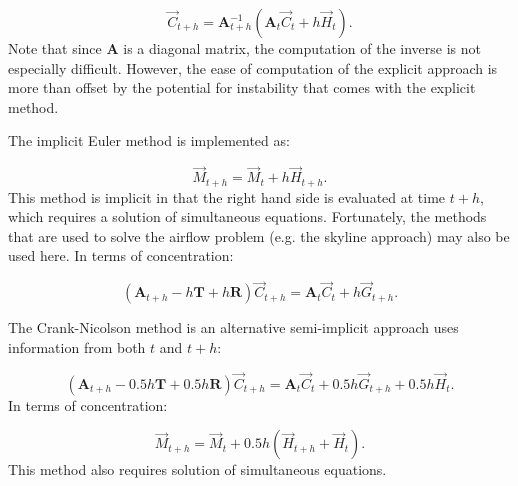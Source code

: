 \documentclass[10pt]{report}
\newcommand{\mat}[1]{\ensuremath{\mathbf{#1}}}
\begin{document}
\begin{equation}
\vec{C}_{t+h} = \mat{A}_{t+h}^{-1}\left( \mat{A}_{t}\vec{C}_t + h\vec{H}_t\right).
\end{equation}
\noindent
Note that since $\mat{A}$ is a diagonal matrix, the computation of the inverse is not
especially difficult. However, the ease of computation of the explicit approach is more
than offset by the potential for instability that comes with the explicit method.

The implicit Euler method is implemented as:

\begin{equation}
\vec{M}_{t+h} = \vec{M}_t + h\vec{H}_{t+h}.
\end{equation}
\noindent
This method is implicit in that the right hand side is evaluated at time $t+h$, which
requires a solution of simultaneous equations. Fortunately, the methods that are used
to solve the airflow problem (e.g. the skyline approach) may also be used here. In terms
of concentration:

\begin{equation}
\left(\mat{A}_{t+h} -h\mat{T} +h\mat{R}\right)\vec{C}_{t+h}
 = \mat{A}_{t}\vec{C}_t + h\vec{G}_{t+h}.
\end{equation}

The Crank-Nicolson method is an alternative semi-implicit approach uses information
from both $t$ and $t+h$:

\begin{equation}
\left(\mat{A}_{t+h} - 0.5h\mat{T} + 0.5h\mat{R}\right)\vec{C}_{t+h}
 = \mat{A}_{t}\vec{C}_t + 0.5h\vec{G}_{t+h} + 0.5h\vec{H}_t.
\end{equation}
\noindent
In terms of concentration:

\begin{equation}
\vec{M}_{t+h} = \vec{M}_t + 0.5h(\vec{H}_{t+h} + \vec{H}_t).
\end{equation}
\noindent
This method also requires solution of simultaneous equations.
\end{document}

